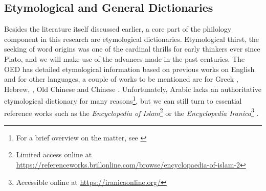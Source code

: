\subsection{Etymological and General Dictionaries}

Besides the literature itself discussed earlier, a core part of the philology component in this research are etymological dictionaries. Etymological thirst, the seeking of word origins was one of the cardinal thrills for early thinkers ever since Plato, and we will make use of the advances made in the past centuries. The \gls{OED} has detailed etymological information based on previous works on English and for other languages, a couple of works to be mentioned are for Greek \textcite{beekes_etymological_2010}, Hebrew, \textcite{klein_comprehensive_1987}, Old Chinese \textcite{schuessler_abc_2007} and Chinese \textcite{liu_hanyu_1985}. Unfortunately, Arabic lacks an authoritative etymological dictionary for many reasons\footnote{For a brief overview on the matter, see \textcite{blazek_etymology_2006}}, but we can still turn to essential reference works such as the \textit{Encyclopedia of Islam}\footnote{Limited access online at \url{https://referenceworks.brillonline.com/browse/encyclopaedia-of-islam-2}} \autocite{ei2} or the \textit{Encyclopedia Iranica}\footnote{Accessible online at \url{https://iranicaonline.org/}} \autocite{eir}. 











